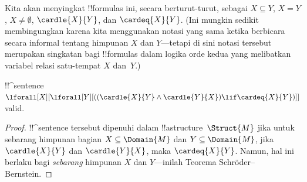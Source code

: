 \documentclass[../../../include/open-logic-section]{subfiles}
\begin{document}
Kita akan menyingkat !!{formula}s ini, secara berturut-turut, sebagai
$X \subseteq Y$, $X = Y$, $X \neq \emptyset$, $\cardle{X}{Y}$, dan
$\cardeq{X}{Y}$. (Ini mungkin sedikit membingungkan karena kita menggunakan
notasi yang sama ketika berbicara secara informal tentang himpunan $X$ dan
$Y$---tetapi di sini notasi tersebut merupakan singkatan bagi !!{formula}s
dalam logika orde kedua yang melibatkan variabel relasi satu-tempat $X$
dan~$Y$.)

\begin{prop}
!!^{sentence} $\lforall[X][\lforall[Y][((\cardle{X}{Y} \land
    \cardle{Y}{X}) \lif \cardeq{X}{Y})]]$ valid.
\end{prop}

\begin{proof}
!!^{sentence} tersebut dipenuhi dalam !!a{structure}~$\Struct{M}$ jika untuk
sebarang himpunan bagian $X \subseteq \Domain{M}$ dan
$Y \subseteq \Domain{M}$, jika $\cardle{X}{Y}$ dan $\cardle{Y}{X}$, maka
$\cardeq{X}{Y}$. Namun, hal ini berlaku bagi \emph{sebarang} himpunan $X$
dan $Y$---inilah Teorema Schr\"oder--Bernstein.
\end{proof}
\end{document}
